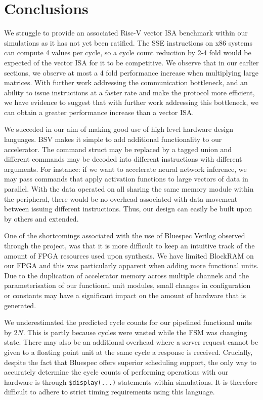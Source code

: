 \documentclass[a4paper,8pt]{report}
\begin{document}
\section{Conclusions}
We struggle to provide an associated Risc-V vector ISA benchmark within our
simulations as it has not yet been ratified. The SSE instructions on x86
systems can compute 4 values per cycle, so a cycle count reduction by 2-4 fold
would be expected of the vector ISA for it to be competitive. We observe that in
our earlier sections, we observe at most a 4 fold performance increase when
multiplying large matrices. With further work addressing the communication
bottleneck, and an ability to issue instructions at a faster rate and make the
protocol more efficient, we have evidence to suggest that with further work
addressing this bottleneck, we can obtain a greater performance increase than a
vector ISA.

We suceeded in our aim of making good use of high level hardware design
languages. BSV makes it simple to add additional functionality to our
accelerator. The command struct may be replaced by a tagged union and different
commands may be decoded into different instructions with different arguments.
For instance: if we want to accelerate neural network inference, we may pass
commands that apply activation functions to large vectors of data in parallel.
With the data operated on all sharing the same memory module within the
peripheral, there would be no overhead associated with data movement between
issuing different instructions. Thus, our design can easily be built upon by
others and extended.

One of the shortcomings associated with the use of Bluespec Verilog observed
through the project, was that it is more difficult to keep an intuitive track of
the amount of FPGA resources used upon synthesis. We have limited BlockRAM on
our FPGA and this was particularly apparent when adding more functional units.
Due to the duplication of accelerator memory across multiple channels and the
parameterisation of our functional unit modules, small changes in configuration
or constants may have a significant impact on the amount of hardware that is
generated.

We underestimated the predicted cycle counts for our pipelined functional units
by $2N$. This is partly because cycles were wasted while the FSM was changing
state. There may also be an additional overhead where a server request cannot be
given to a floating point unit at the same cycle a response is received.
Crucially, despite the fact that Bluespec offers superior scheduling support,
the only way to accurately determine the cycle counts of performing operations
with our hardware is through \texttt{\$display(...)} statements within
simulations. It is therefore difficult to adhere to strict timing requirements
using this language.
\end{document}
